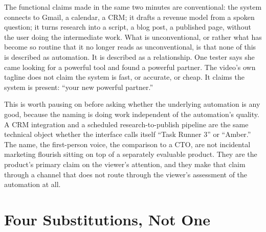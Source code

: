 \documentclass[11pt]{article}
\begin{document}
The functional claims made in the same two minutes are conventional: the system connects to Gmail, a calendar, a CRM; it drafts a revenue model from a spoken question; it turns research into a script, a blog post, a published page, without the user doing the intermediate work. What is unconventional, or rather what has become so routine that it no longer reads as unconventional, is that none of this is described as automation. It is described as a relationship. One tester says she came looking for a powerful tool and found a powerful partner. The video's own tagline does not claim the system is fast, or accurate, or cheap. It claims the system is present: ``your new powerful partner.''

This is worth pausing on before asking whether the underlying automation is any good, because the naming is doing work independent of the automation's quality. A CRM integration and a scheduled research-to-publish pipeline are the same technical object whether the interface calls itself ``Task Runner 3'' or ``Amber.'' The name, the first-person voice, the comparison to a CTO, are not incidental marketing flourish sitting on top of a separately evaluable product. They are the product's primary claim on the viewer's attention, and they make that claim through a channel that does not route through the viewer's assessment of the automation at all.

\section{Four Substitutions, Not One}
\label{sec:chain}
\end{document}
